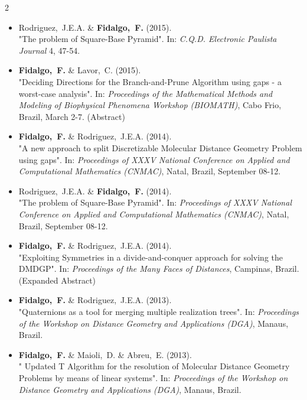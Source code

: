\documentclass[10pt,A4,english]{article}
\begin{document}
\begin{paracol}{2}
\begin{rightcolumn}
\begin{itemize}[leftmargin=*]
%
\\[5pt]
%
\item Rodriguez,~J.E.A. \& \textbf{Fidalgo,~F.} (2015). \\ "The problem of Square-Base Pyramid". In: \textit{C.Q.D. Electronic Paulista Journal} 4, 47-54.
%
\\[5pt]
%
\item \textbf{Fidalgo,~F.} \& Lavor,~C. (2015). \\ "Deciding Directions for the Branch-and-Prune Algorithm using gaps - a worst-case analysis". In: \textit{Proceedings of the Mathematical Methods and Modeling of Biophysical Phenomena Workshop (BIOMATH)}, Cabo Frio, Brazil, March 2-7. (Abstract)
%
\\[5pt]
%
\item \textbf{Fidalgo,~F.} \& Rodriguez,~J.E.A. (2014). \\ "A new approach to split Discretizable Molecular Distance Geometry Problem using gaps". In: \textit{Proceedings of XXXV National Conference on Applied and Computational Mathematics (CNMAC)}, Natal, Brazil, September 08-12.
%
\\[5pt]
%
\item Rodriguez,~J.E.A. \& \textbf{Fidalgo,~F.} (2014). \\ "The problem of Square-Base Pyramid". In: \textit{Proceedings of XXXV National Conference on Applied and Computational Mathematics (CNMAC)}, Natal, Brazil, September 08-12.
%
\\[5pt]
%
\item \textbf{Fidalgo,~F.} \& Rodriguez,~J.E.A. (2014). \\ "Exploiting Symmetries in a divide-and-conquer approach for solving the DMDGP". In: \textit{Proceedings of the Many Faces of Distances}, Campinas, Brazil. (Expanded Abstract)
%
\\[5pt]
%
\item \textbf{Fidalgo,~F.} \& Rodriguez,~J.E.A. (2013). \\ "Quaternions as a tool for merging multiple realization trees". In: \textit{Proceedings of the Workshop on Distance Geometry and Applications (DGA)}, Manaus, Brazil.
%
\\[5pt]
%
\item \textbf{Fidalgo,~F.} \& Maioli,~D. \& Abreu,~E. (2013). \\ " Updated T Algorithm for the resolution of Molecular Distance Geometry Problems by means of linear systems". In: \textit{Proceedings of the Workshop on Distance Geometry and Applications (DGA)}, Manaus, Brazil.

\end{itemize}
\end{rightcolumn}
\end{paracol}
\end{document}
